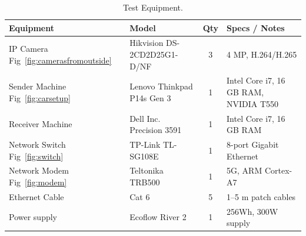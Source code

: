 \begin{table}[H]
    \centering
    \caption{Test Equipment.}\label{tab:test_equipment}
    \begin{tabular}{|l|l|c|p{4.3cm}|}
    \hline
    \textbf{Equipment}                              & \textbf{Model}                  & \textbf{Qty} & \textbf{Specs / Notes} \\
    \hline
    IP Camera Fig~\ref{fig:camerasfromoutside}      & Hikvision DS-2CD2D25G1-D/NF     & 3            & 4 MP, H.264/H.265 \\
    \hline
    Sender Machine Fig~\ref{fig:carsetup}           & Lenovo Thinkpad P14s Gen 3      & 1            & Intel Core i7, 16 GB RAM, NVIDIA T550\\
    \hline
    Receiver Machine                                & Dell Inc. Precision 3591        & 1            & Intel Core i7, 16 GB RAM \\
    \hline
    Network Switch Fig~\ref{fig:switch}             & TP-Link TL-SG108E               & 1            & 8-port Gigabit Ethernet \\
    \hline
    Network Modem Fig~\ref{fig:modem}               & Teltonika TRB500                & 1            & 5G, ARM Cortex-A7 \\
    \hline
    Ethernet Cable                                  & Cat 6                           & 5            & 1--5 m patch cables \\
    \hline
    Power supply                                    & Ecoflow River 2                 & 1            & 256Wh, 300W supply \\
    \hline
    \end{tabular}
\end{table}
